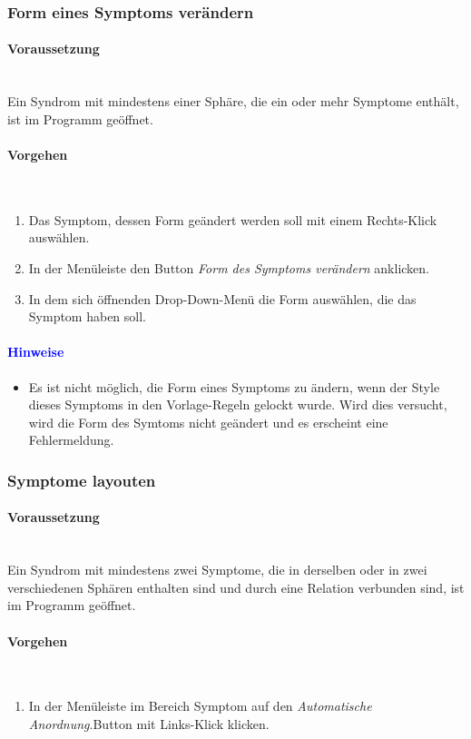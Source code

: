 \documentclass[enabledeprecatedfontcommands,fontsize=11pt,paper=a4,twoside]{scrartcl}
\newcommand*{\hint}{\paragraph{\textcolor{blue}{Hinweise}}}
\newcommand*{\condition}{\paragraph{Voraussetzung}$\;$ \vspace{0.2cm}\\}
\newcommand*{\actions}{\paragraph{Vorgehen} $\;$\vspace{0.2cm}\\}
\begin{document}
			\subsubsection{Form eines Symptoms verändern}
							\condition 	
		Ein Syndrom mit mindestens einer Sphäre, die ein oder mehr Symptome enthält, ist im Programm geöffnet. 
		\actions
		\begin{enumerate}
			\item Das Symptom, dessen Form geändert werden soll mit einem Rechts-Klick auswählen. 
			\item In der Menüleiste den Button \textit{Form des Symptoms verändern} anklicken.
			\item In dem sich öffnenden Drop-Down-Menü die Form auswählen, die das Symptom haben soll.
		\end{enumerate}
		\hint
		\begin{itemize}
			\item Es ist nicht möglich, die Form eines Symptoms zu ändern, wenn der Style dieses Symptoms in den Vorlage-Regeln gelockt wurde. Wird dies versucht, wird die Form des Symtoms nicht geändert und es erscheint eine Fehlermeldung.
		\end{itemize}
		\subsubsection{Symptome layouten}
				\condition 	
		Ein Syndrom mit mindestens zwei Symptome, die in derselben oder in zwei verschiedenen Sphären enthalten sind und durch eine Relation verbunden sind, ist im Programm geöffnet. 
		\actions  
		\begin{enumerate}
			\item In der Menüleiste im Bereich Symptom auf den \textit{Automatische Anordnung}.Button mit Links-Klick klicken.
		\end{enumerate}

			
			\newpage	
\end{document}
